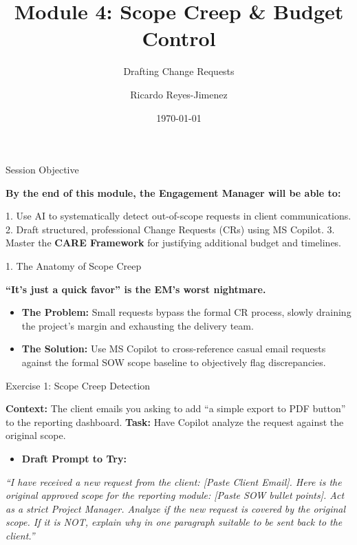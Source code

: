 \documentclass[aspectratio=169]{beamer}
\title[Module 4: Scope Creep & Budget]{Module 4: Scope Creep & Budget Control}
\subtitle{Drafting Change Requests}
\author{Ricardo Reyes-Jimenez}
\institute{Capgemini}
\date{\today}
\begin{document}
\begin{frame}
  \titlepage
\end{frame}

\usebackgroundtemplate{}



\begin{frame}[fragile]{Session Objective}


\textbf{By the end of this module, the Engagement Manager will be able to:}

1. Use AI to systematically detect out-of-scope requests in client communications.
2. Draft structured, professional Change Requests (CRs) using MS Copilot.
3. Master the \textbf{CARE Framework} for justifying additional budget and timelines.

\end{frame}



\begin{frame}[fragile]{1. The Anatomy of Scope Creep}


\textbf{``It's just a quick favor'' is the EM's worst nightmare.}

\begin{itemize}
  \item \textbf{The Problem:} Small requests bypass the formal CR process, slowly draining the project's margin and exhausting the delivery team.
  \item \textbf{The Solution:} Use MS Copilot to cross-reference casual email requests against the formal SOW scope baseline to objectively flag discrepancies.
\end{itemize}
\end{frame}



\begin{frame}[fragile]{Exercise 1: Scope Creep Detection}


\textbf{Context:} The client emails you asking to add ``a simple export to PDF button'' to the reporting dashboard.
\textbf{Task:} Have Copilot analyze the request against the original scope.

\begin{itemize}
  \item \textbf{Draft Prompt to Try:}
\end{itemize}
\textit{``I have received a new request from the client: [Paste Client Email]. Here is the original approved scope for the reporting module: [Paste SOW bullet points]. Act as a strict Project Manager. Analyze if the new request is covered by the original scope. If it is NOT, explain why in one paragraph suitable to be sent back to the client.''}

\end{frame}
\end{document}
